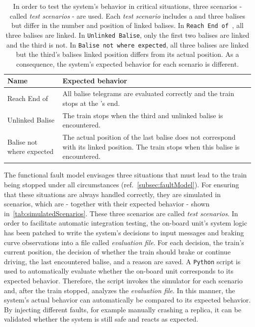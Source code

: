 \begin{table}[h!]
	\begin{center}
		\caption{In order to test the system's behavior in critical situations, three scenarios - called \textit{test scenarios} - are used. Each \textit{test scenario} includes a  and three balises but differ in the number and position of linked balises. In \texttt{Reach End of }, all three balises are linked. In \texttt{Unlinked Balise}, only the first two balises are linked and the third is not. In \texttt{Balise not where expected}, all three balises are linked but the third's balises linked position differs from its actual position. As a consequence, the system's expected behavior for each scenario is different.}
		\label{tab:simulatedScenarios}
		\begin{tabularx}{\textwidth}{|X|X|}
			\hline
			\textbf{Name} & \textbf{Expected behavior}\\
			\hline \hline
			Reach End of \abr{MA} & All balise telegrams are evaluated correctly and the train stops at the \abr{MA}'s end. \\
			\hline
			Unlinked Balise & The train stops when the third and unlinked balise is encountered. \\
			\hline
			Balise not where expected & The actual position of the last balise does not correspond with its linked position. The train stops when this balise is encountered. \\
			\hline
		\end{tabularx}
	\end{center}
\end{table}


The functional fault model envisages three situations that must lead to the train being stopped under all circumstances (ref.~\autoref{subsec:faultModel}).
For ensuring that these situations are always handled correctly, they are simulated in scenarios, which are - together with their expected behavior - shown in~\autoref{tab:simulatedScenarios}.
These three scenarios are called \textit{test scenarios}.
In order to facilitate automatic integration testing, the on-board unit's system logic has been patched to write the system's decisions to input messages and braking curve observations into a file called \textit{evaluation file}.
For each decision, the train's current position, the decision of whether the train should brake or continue driving, the last encountered balise, and a reason are saved.
A \texttt{Python} script is used to automatically evaluate whether the on-board unit corresponds to its expected behavior.
Therefore, the script invokes the simulator for each scenario and, after the train stopped, analyzes the \textit{evaluation file}.
In this manner, the system's actual behavior can automatically be compared to its expected behavior.
By injecting different faults, for example manually crashing a replica, it can be validated whether the system is still safe and reacts as expected.


